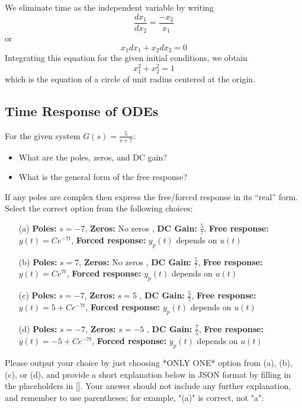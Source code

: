 \documentclass[12pt]{article}
\begin{document}
We eliminate time as the independent variable by writing
\[ \frac{dx_1}{dx_2} = \frac{-x_2}{x_1} \]
or
\[ x_1 dx_1 + x_2 dx_2 = 0 \]
Integrating this equation for the given initial conditions, we obtain
\[ x_1^2 + x_2^2 = 1 \]
which is the equation of a circle of unit radius centered at the origin.
\clearpage

\subsection{Time Response of ODEs}

For the given system \(G(s) = \frac{5}{s+7}\):
\begin{itemize}
    \item  What are the poles, zeros, and DC gain?
    \item  What is the general form of the free response?
\end{itemize}
If any poles are complex then express the free/forced response in its “real” form.\\
Select the correct option from the following choices:
\begin{enumerate}
    \item [(a)] \textbf{Poles:} \(s = -7\), \textbf{Zeros:} No zeros , \textbf{DC Gain:} \( \frac{5}{7}\), \textbf{Free response:} \(y(t) = C e^{-7t}\), \textbf{Forced response:} \(y_p(t)\) depends on \(u(t)\)
    \item [(b)] \textbf{Poles:} \(s = 7\), \textbf{Zeros:} No zeros , \textbf{DC Gain:} \( \frac{5}{7}\), \textbf{Free response:} \(y(t) = C e^{7t}\), \textbf{Forced response:} \(y_p(t)\) depends on \(u(t)\)
    \item [(c)] \textbf{Poles:} \(s = -7\), \textbf{Zeros:} \(s = 5\) , \textbf{DC Gain:} \( \frac{5}{7}\), \textbf{Free response:} \(y(t) = 5 + C e^{-7t}\), \textbf{Forced response:} \(y_p(t)\) depends on \(u(t)\)
    \item [(d)] \textbf{Poles:} \(s = -7\), \textbf{Zeros:} \(s=-5 \) , \textbf{DC Gain:} \( \frac{7}{5}\), \textbf{Free response:} \(y(t) = -5+ C e^{-7t}\), \textbf{Forced response:} \(y_p(t)\) depends on \(u(t)\)
\end{enumerate}


Please output your choice by just choosing *ONLY ONE* option from (a), (b), (c), or (d), and provide a short explanation below in JSON format by filling in the placeholders in []. Your answer should not include any further explanation, and remember to use parentheses; for example, "(a)" is correct, not "a": 
\end{document}
